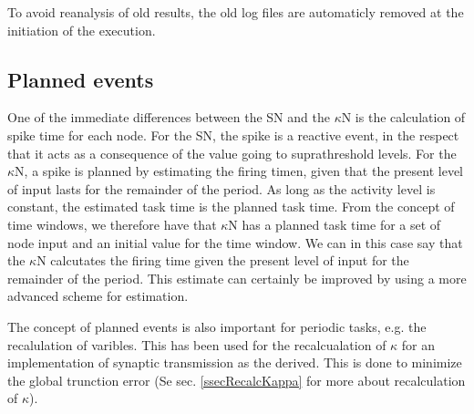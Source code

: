To avoid reanalysis of old results, the old log files are automaticly removed at the initiation of the execution.








\subsection{Planned events}
	\label{secPlannedEvents}
	One of the immediate differences between the SN and the $\kappa$N is the calculation of spike time for each node.
	For the SN, the spike is a reactive event, in the respect that it acts as a consequence of the value going to suprathreshold levels.
	For the $\kappa$N, a spike is planned by estimating the firing timen, given that the present level of input lasts for the remainder of the period. %
	As long as the activity level is constant, the estimated task time is the planned task time.
	From the concept of time windows, we therefore have that $\kappa$N has a planned task time for a set of node input and an initial value for the time window. %
	We can in this case say that the $\kappa$N calcutates the firing time given the present level of input for the remainder of the period.
	This estimate can certainly be improved by using a more advanced scheme for estimation.

	The concept of planned events is also important for periodic tasks, e.g. the recalulation of varibles. 
	This has been used for the recalcualation of $\kappa$ for an implementation of synaptic transmission as the derived.
	This is done to minimize the global trunction error (Se sec. \ref{ssecRecalcKappa} for more about recalculation of $\kappa$).

